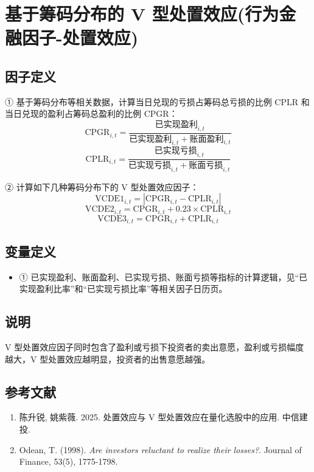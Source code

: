 \documentclass{article}
\begin{document}
\section{基于筹码分布的 V 型处置效应(行为金融因子-处置效应)}

\subsection{因子定义}

① 基于筹码分布等相关数据，计算当日兑现的亏损占筹码总亏损的比例 \( \mathrm{CPLR} \) 和当日兑现的盈利占筹码总盈利的比例 \( \mathrm{CPGR} \)：
\begin{equation}
    \mathrm{CPGR}_{i,t} = \frac{\text{已实现盈利}_{i,t}}{\text{已实现盈利}_{i,t} + \text{账面盈利}_{i,t}}
\end{equation}
\begin{equation}
    \mathrm{CPLR}_{i,t} = \frac{\text{已实现亏损}_{i,t}}{\text{已实现亏损}_{i,t} + \text{账面亏损}_{i,t}}
\end{equation}

② 计算如下几种筹码分布下的 V 型处置效应因子：
\begin{equation}
    \mathrm{VCDE1}_{i,t} = |\mathrm{CPGR}_{i,t} - \mathrm{CPLR}_{i,t}|
\end{equation}
\begin{equation}
    \mathrm{VCDE2}_{i,t} = \mathrm{CPGR}_{i,t} + 0.23 \times \mathrm{CPLR}_{i,t}
\end{equation}
\begin{equation}
    \mathrm{VCDE3}_{i,t} = \mathrm{CPGR}_{i,t} + \mathrm{CPLR}_{i,t}
\end{equation}

\subsection{变量定义}
\begin{itemize}
    \item ① 已实现盈利、账面盈利、已实现亏损、账面亏损等指标的计算逻辑，见“已实现盈利比率”和“已实现亏损比率”等相关因子日历页。
\end{itemize}

\subsection{说明}
V 型处置效应因子同时包含了盈利或亏损下投资者的卖出意愿，盈利或亏损幅度越大，V 型处置效应越明显，投资者的出售意愿越强。

\subsection{参考文献}
\begin{enumerate}
    \item 陈升锐, 姚紫薇. 2025. 处置效应与 V 型处置效应在量化选股中的应用. 中信建投.
    \item Odean, T. (1998). \textit{Are investors reluctant to realize their losses?}. Journal of Finance, 53(5), 1775-1798.
\end{enumerate}
\end{document}
